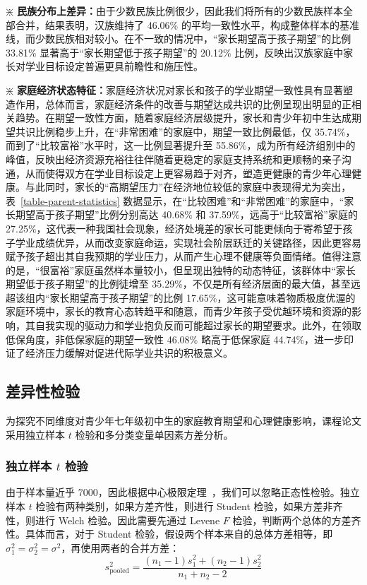\documentclass[zihao = -4, linespread = 1.5]{article}
\begin{document}
$\divideontimes$ \textbf{民族分布上差异：}由于少数民族比例很少，因此我们将所有的少数民族样本全部合并，结果表明，汉族维持了 46.06\% 的平均一致性水平，构成整体样本的基准线，而少数民族相对较小。在不一致的情况中，“家长期望高于孩子期望”的比例 33.81\% 显著高于“家长期望低于孩子期望”的 20.12\% 比例，反映出汉族家庭中家长对学业目标设定普遍更具前瞻性和施压性。

$\divideontimes$ \textbf{家庭经济状态特征：}家庭经济状况对家长和孩子的学业期望一致性具有显著塑造作用，总体而言，家庭经济条件的改善与期望达成共识的比例呈现出明显的正相关趋势。在期望一致性方面，随着家庭经济层级提升，家长和青少年初中生达成期望共识比例稳步上升，在“非常困难”的家庭中，期望一致比例最低，仅 35.74\%，而到了“比较富裕”水平时，这一比例显著提升至 55.86\%，成为所有经济组别中的峰值，反映出经济资源充裕往往伴随着更稳定的家庭支持系统和更顺畅的亲子沟通，从而使得双方在学业目标设定上更容易趋于对齐，塑造更健康的青少年心理健康。与此同时，家长的“高期望压力”在经济地位较低的家庭中表现得尤为突出，表~\ref{table-parent-statistics} 数据显示，在“比较困难”和“非常困难”的家庭中，“家长期望高于孩子期望”比例分别高达 40.68\% 和 37.59\%，远高于“比较富裕”家庭的 27.25\%，这代表一种我国社会现象，经济处境差的家长可能更倾向于寄希望于孩子学业成绩优异，从而改变家庭命运，实现社会阶层跃迁的关键路径，因此更容易赋予孩子超出其自我预期的学业压力，从而产生心理不健康等负面情绪。值得注意的是，“很富裕”家庭虽然样本量较小，但呈现出独特的动态特征，该群体中“家长期望低于孩子期望”的比例徒增至 35.29\%，不仅是所有经济层面的最大值，甚至远超该组内“家长期望高于孩子期望”的比例 17.65\%，这可能意味着物质极度优渥的家庭环境中，家长的教育心态转趋平和随意，而青少年孩子受优越环境和资源的影响，其自我实现的驱动力和学业抱负反而可能超过家长的期望要求。此外，在领取低保角度，非低保家庭的期望一致性 46.08\% 略高于低保家庭 44.74\%，进一步印证了经济压力缓解对促进代际学业共识的积极意义。



\subsection{差异性检验}
为探究不同维度对青少年七年级初中生的家庭教育期望和心理健康影响，课程论文采用独立样本 $t$ 检验和多分类变量单因素方差分析。



\subsubsection{独立样本 $t$ 检验}
由于样本量近乎 7000，因此根据中心极限定理~\citep{Moivre,Polya}，我们可以忽略正态性检验。独立样本 $t$ 检验有两种类别，如果方差齐性，则进行 Student 检验，如果方差非齐性，则进行 Welch 检验。因此需要先通过 Levene $F$ 检验，判断两个总体的方差齐性。具体而言，对于 Student 检验，假设两个样本来自的总体方差相等，即 $\sigma_1^2=\sigma_2^2=\sigma^2$，再使用两者的合并方差：
\[ s_{\text{pooled}}^2=\dfrac{\displaystyle(n_1-1)s_1^2+(n_2-1)s_2^2}{n_1+n_2-2} \]
\end{document}
